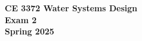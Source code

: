\documentclass[12pt]{article}
\begin{document}
\begingroup
\begin{center}
{\textbf{{ CE 3372 Water Systems Design} \\ Exam 2 \\ Spring 2025} }
\end{center}
\endgroup

\end{document}

